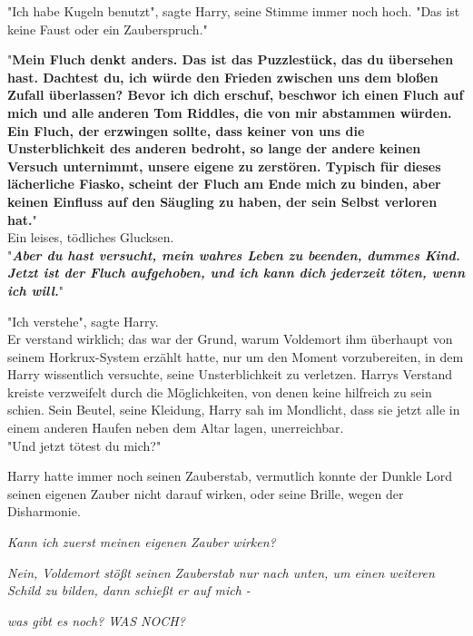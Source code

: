 {"Ich habe Kugeln benutzt", sagte Harry, seine Stimme immer noch hoch. "Das ist keine Faust oder ein Zauberspruch."

"\textbf{Mein Fluch denkt anders. Das ist das Puzzlestück, das du übersehen hast. Dachtest du, ich würde den Frieden zwischen uns dem bloßen Zufall überlassen? Bevor ich dich erschuf, beschwor ich einen Fluch auf mich und alle} \textbf{anderen Tom Riddles, die von mir abstammen würden. Ein Fluch, der erzwingen sollte, dass keiner von uns die Unsterblichkeit des anderen bedroht, so lange der andere keinen Versuch unternimmt, unsere eigene zu zerstören. Typisch für dieses lächerliche Fiasko, scheint der Fluch am Ende mich zu binden, aber keinen Einfluss auf den Säugling zu haben, der sein Selbst verloren hat.}"\\ Ein leises, tödliches Glucksen.\\ "\textbf{\emph{Aber du hast versucht, mein wahres Leben zu beenden, dummes Kind. Jetzt ist der Fluch aufgehoben, und ich kann dich jederzeit töten, wenn ich will.}}"

"Ich verstehe", sagte Harry.\\ Er verstand wirklich; das war der Grund, warum Voldemort ihm überhaupt von seinem Horkrux-System erzählt hatte, nur um den Moment vorzubereiten, in dem Harry wissentlich versuchte, seine Unsterblichkeit zu verletzen. Harrys Verstand kreiste verzweifelt durch die Möglichkeiten, von denen keine hilfreich zu sein schien. Sein Beutel, seine Kleidung, Harry sah im Mondlicht, dass sie jetzt alle in einem anderen Haufen neben dem Altar lagen, unerreichbar.\\ "Und jetzt tötest du mich?"

Harry hatte immer noch seinen Zauberstab, vermutlich konnte der Dunkle Lord seinen eigenen Zauber nicht darauf wirken, oder seine Brille, wegen der Disharmonie.

\emph{Kann ich zuerst meinen eigenen Zauber wirken?}

\emph{Nein, Voldemort stößt seinen Zauberstab nur nach unten, um einen weiteren Schild zu bilden, dann schießt er auf mich -}

\emph{was gibt es noch? WAS NOCH?}

}
